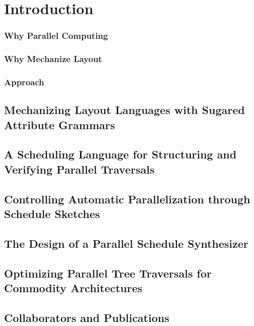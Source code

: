 \chapter{Introduction}

\subsection{Why Parallel Computing}
\subsection{Why Mechanize Layout}
\subsection{Approach}

\section{Mechanizing Layout Languages with Sugared Attribute Grammars}


\section{A Scheduling Language for Structuring and Verifying Parallel Traversals}
\section{Controlling Automatic Parallelization through Schedule Sketches}
\section{The Design of a Parallel Schedule Synthesizer}
\section{Optimizing Parallel Tree Traversals for Commodity Architectures}

\section{Collaborators and Publications}



